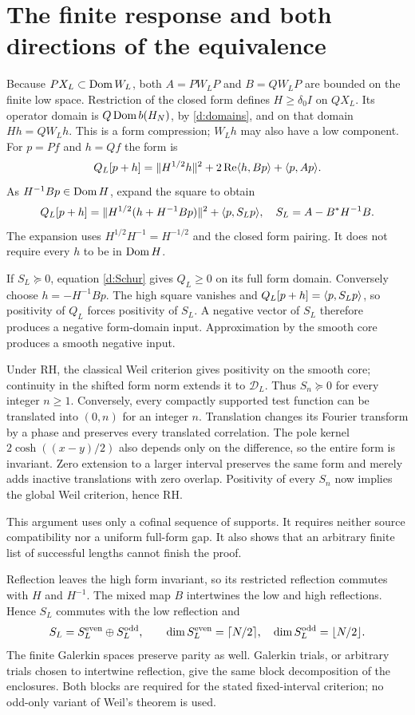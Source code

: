 \section{The finite response and both directions of the equivalence}
Because $PX_L\subset\operatorname{Dom} W_L$, both $A=PW_LP$ and $B=QW_LP$ are bounded
on the finite low space. Restriction of the closed form defines
$H\ge\delta_0I$ on $QX_L$. Its operator domain is
$Q\operatorname{Dom} b(H_N)$, by \eqref{d:domains}, and on that domain $Hh=QW_Lh$.
This is a form compression; $W_Lh$ may also have a low component.
For $p=Pf$ and $h=Qf$ the form is
\[
Q_L[p+h]=\lVert H^{1/2}h\rVert^2+2\operatorname{Re}\langle h,Bp\rangle+\langle p,Ap\rangle.
\]
As $H^{-1}Bp\in\operatorname{Dom} H$, expand the square to obtain
\begin{equation}\label{d:Schur}
Q_L[p+h]=\lVert H^{1/2}(h+H^{-1}Bp)\rVert^2+\langle p,S_Lp\rangle,
\quad S_L=A-B^*H^{-1}B.
\end{equation}
The expansion uses $H^{1/2}H^{-1}=H^{-1/2}$ and the closed form pairing.
It does not require every $h$ to be in $\operatorname{Dom} H$.

If $S_L\succeq0$, equation \eqref{d:Schur} gives $Q_L\ge0$ on its full
form domain. Conversely choose $h=-H^{-1}Bp$. The high square vanishes
and $Q_L[p+h]=\langle p,S_Lp\rangle$, so positivity of $Q_L$ forces positivity of
$S_L$. A negative vector of $S_L$ therefore produces a negative form-domain
input. Approximation by the smooth core produces a smooth negative input.

Under RH, the classical Weil criterion gives positivity on the smooth
core; continuity in the shifted form norm extends it to $\mathcal D_L$.
Thus $S_n\succeq0$ for every integer $n\ge1$.
Conversely, every compactly supported test function can be translated into
$(0,n)$ for an integer $n$. Translation changes its Fourier transform by
a phase and preserves every translated correlation. The pole kernel
$2\cosh((x-y)/2)$ also depends only on the difference, so the entire form
is invariant. Zero extension to a larger interval preserves the same
form and merely adds inactive translations with zero overlap. Positivity
of every $S_n$ now implies the global Weil criterion, hence RH.

This argument uses only a cofinal sequence of supports. It requires
neither source compatibility nor a uniform full-form gap. It also shows
that an arbitrary finite list of successful lengths cannot finish the proof.

Reflection leaves the high form invariant, so its restricted reflection
commutes with $H$ and $H^{-1}$. The mixed map $B$ intertwines the low and
high reflections. Hence $S_L$ commutes with the low reflection and
\[
S_L=S_L^{\rm even}\oplus S_L^{\rm odd},\qquad
\dim S_L^{\rm even}=\lceil N/2\rceil,\quad
\dim S_L^{\rm odd}=\lfloor N/2\rfloor.
\]
The finite Galerkin spaces preserve parity as well. Galerkin trials, or
arbitrary trials chosen to intertwine reflection, give the same block
decomposition of the enclosures. Both blocks are required for the stated
fixed-interval criterion; no odd-only variant of Weil's theorem is used.

